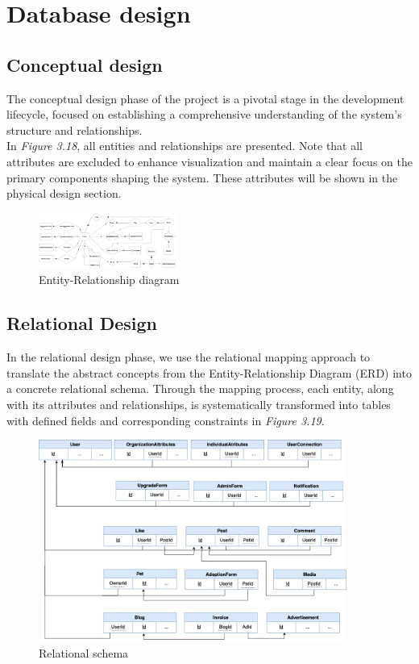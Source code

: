 \newpage
\section{Database design}

\subsection{Conceptual design}

The conceptual design phase of the project is a pivotal stage in the development lifecycle, focused on establishing a comprehensive understanding of the system's structure and relationships.
\\
In \textit{Figure 3.18}, all entities and relationships are presented. Note that all attributes are excluded to enhance visualization and maintain a clear focus on the primary components shaping the system. These attributes will be shown in the physical design section.

\begin{figure}[H]
    \centering
    \includegraphics[angle=-90,width=0.4\textwidth]{Figures/DatabaseDesign/Entities-ERD.png}
    \caption{Entity-Relationship diagram}
\end{figure}
\clearpage

\subsection{Relational Design}

In the relational design phase, we use the relational mapping approach
to translate the abstract concepts from the Entity-Relationship Diagram
(ERD) into a concrete relational schema. Through the mapping process,
each entity, along with its attributes and relationships, is
systematically transformed into tables with defined fields and
corresponding constraints in \emph{Figure 3.19}.

\begin {figure}[H]
\centering
\includegraphics[width=0.9\textwidth]{Figures/DatabaseDesign/Entities-Mapping.png}
\caption{Relational schema}
\end{figure}

